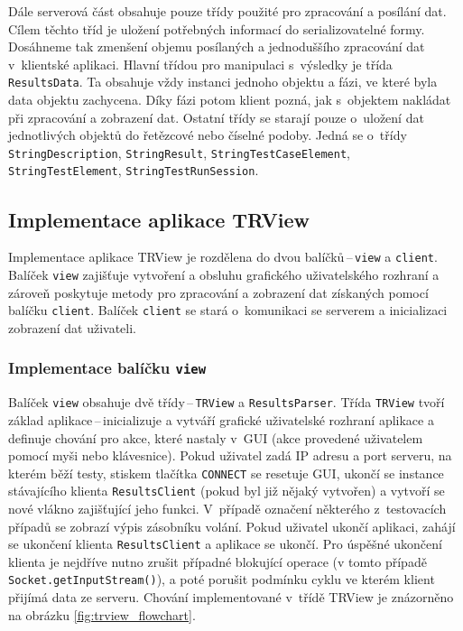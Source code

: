 	Dále serverová část obsahuje pouze třídy použité pro zpracování a posílání dat. Cílem těchto tříd je uložení potřebných informací do serializovatelné formy. Dosáhneme tak zmenšení objemu posílaných a jednoduššího zpracování dat v~klientské aplikaci. Hlavní třídou pro manipulaci s~výsledky je třída \texttt{ResultsData}. Ta obsahuje vždy instanci jednoho objektu a fázi, ve které byla data objektu zachycena. Díky fázi potom klient pozná, jak s~objektem nakládat při zpracování a zobrazení dat. Ostatní třídy se starají pouze o~uložení dat jednotlivých objektů do řetězcové nebo číselné podoby. Jedná se o~třídy \texttt{StringDescription}, \texttt{StringResult}, \texttt{StringTestCaseElement}, \texttt{StringTestElement}, \texttt{StringTestRunSession}.

    \subsection{Implementace aplikace TRView}
    Implementace aplikace TRView je rozdělena do dvou balíčků\,--\,\texttt{view} a \texttt{client}. Balíček \texttt{view} zajišťuje vytvoření a obsluhu grafického uživatelského rozhraní a zároveň poskytuje metody pro zpracování a zobrazení dat získaných pomocí balíčku \texttt{client}. Balíček \texttt{client} se stará o~komunikaci se serverem a inicializaci zobrazení dat uživateli. 
    
      \subsubsection{Implementace balíčku \texttt{view}}
      Balíček \texttt{view} obsahuje dvě třídy\,--\,\texttt{TRView} a \texttt{ResultsParser}. Třída \texttt{TRView} tvoří základ aplikace\,--\,inicializuje a vytváří grafické uživatelské rozhraní aplikace a definuje chování pro akce, které nastaly v~GUI (akce provedené uživatelem pomocí myši nebo klávesnice). Pokud uživatel zadá IP adresu a port serveru, na kterém běží testy, stiskem tlačítka \texttt{CONNECT} se resetuje GUI, ukončí se instance stávajícího klienta \texttt{ResultsClient} (pokud byl již nějaký vytvořen) a vytvoří se nové vlákno zajišťující jeho funkci. V~případě označení některého z~testovacích případů se zobrazí výpis zásobníku volání. Pokud uživatel ukončí aplikaci, zahájí se ukončení klienta \texttt{ResultsClient} a aplikace se ukončí. Pro úspěšné ukončení klienta je nejdříve nutno zrušit případné blokující operace (v tomto případě \texttt{Socket.getInputStream()}), a poté porušit podmínku cyklu ve kterém klient přijímá data ze serveru. Chování implementované v~třídě TRView je znázorněno na obrázku \ref{fig:trview_flowchart}.

